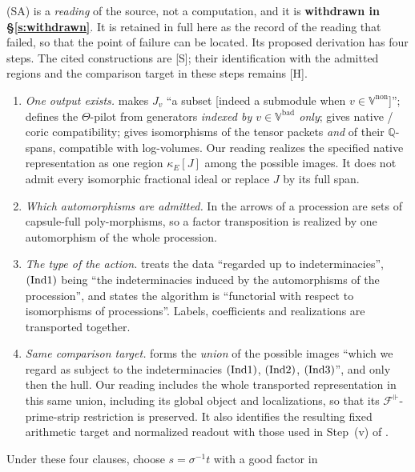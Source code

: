 \documentclass[11pt]{article}
\theoremstyle{plain}
\theoremstyle{definition}
\newcommand{\Vbad}{\mathbb{V}^{\mathrm{bad}}}
\newcommand{\VV}{\mathbb{V}}
\newcommand{\Ind}[1]{\textup{(Ind#1)}}
\newcommand{\SA}{\textup{(SA)}}
\begin{document}
\SA{} is a \emph{reading} of the source, not a computation, and it is
\textbf{withdrawn in \S\ref{s:withdrawn}}.  It is retained in full here as the
record of the reading that failed, so that the point of failure can be located.
Its proposed derivation has four steps.  The cited constructions are \textup{[S]};
their identification with the admitted regions and the comparison target
in these steps remains \textup{[H]}.
\begin{enumerate}[label=(SA\arabic*),leftmargin=3.1em,itemsep=1pt]
\item \emph{One output exists.}  \cite[Prop.~3.7(ii),(v)]{IUT3} makes $J_v$ ``a
 subset [indeed a submodule when $v\in\VV^{\mathrm{non}}$]'';
 \cite[Def.~3.8(i)]{IUT3} defines the $\Theta$-pilot from generators
 \emph{indexed by $v\in\Vbad$ only}; \cite[Prop.~3.10(i)]{IUT3} gives native /
 coric compatibility; \cite[Thm.~3.11(ii)(a)]{IUT3} gives isomorphisms of the
 tensor packets \emph{and} of their $\mathbb{Q}$-spans, compatible with
 log-volumes.  Our reading realizes the specified native representation as
 one region $\kappa_E[J]$ among the possible images.  It does not admit
 every isomorphic fractional ideal or replace $J$ by its full span.
\item \emph{Which automorphisms are admitted.}  In \cite[\S0, Def.~4.10]{IUT1}
 the arrows of a procession are sets of capsule-full poly-morphisms, so a factor
 transposition is realized by one automorphism of the whole procession.
\item \emph{The type of the action.}  \cite[Thm.~3.11(i)]{IUT3} treats the data
 ``regarded up to indeterminacies'', $\Ind1$ being ``the indeterminacies induced
 by the automorphisms of the procession'', and states the algorithm is
 ``functorial with respect to isomorphisms of processions''.  Labels,
 coefficients and realizations are transported together.
\item \emph{Same comparison target.}  \cite[Cor.~3.12]{IUT3} forms the
 \emph{union} of the possible images ``which we regard as subject to the
 indeterminacies $\Ind1$, $\Ind2$, $\Ind3$'', and only then the hull.
 Our reading includes the whole transported representation in this same
 union, including its global object and localizations, so that its
 $\mathcal F^\Vdash$-prime-strip restriction is preserved.  It also
 identifies the resulting fixed arithmetic target and normalized readout
 with those used in Step~(v) of \cite[Thm.~1.10]{IUT4}.
\end{enumerate}
Under these four clauses, choose $s=\sigma^{-1}t$ with a good factor in
\end{document}
